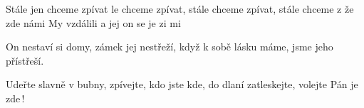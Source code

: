 \begin{TEXT}{Stále jen chceme zpívat}
\REFREN 	{}le  chceme zpívat, \NL
	stále  chceme zpívat, \NL
	stále  chceme z\NL
	že  zde  námi 
\SLOKA	My  vzdálili  \NL
	a  jej \NL
	on   se  \NL
	je zi mi  
\REFREN 

\SLOKA	On nestaví si domy,\NL
	zámek jej nestřeží,\NL
	když k sobě lásku máme,\NL
	jsme jeho přístřeší. 
\REFREN 

\SLOKA	Udeřte slavně v bubny,\NL
	zpívejte, kdo jste kde,\NL
	do dlaní zatleskejte,\NL
	volejte Pán je zde\,! 
\REFREN  
\end{TEXT}
